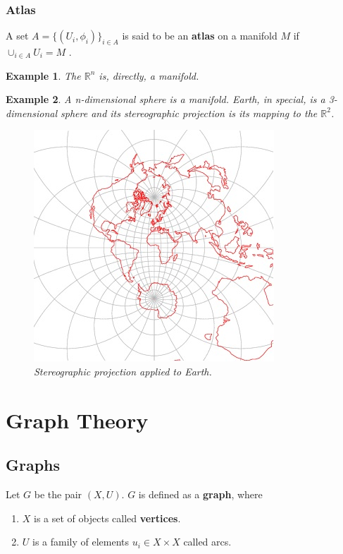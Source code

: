 \documentclass[12pt]{report}
\newtheorem{example}{Example}[section]
\begin{document}
\subsubsection{Atlas}

A set $A = \{(U_i, \phi_i)\}_{i \in A}$ is said to be an \textbf{atlas} on a manifold $M$ if $\cup_{i \in A} U_i = M$ \cite{lee2012}.

\begin{example}
	The $\mathbb{R}^n$ is, directly, a manifold.
\end{example}

\begin{example}
	A n-dimensional sphere is a manifold. Earth, in special, is a 3-dimensional sphere and its stereographic projection is its mapping to the $\mathbb{R}^2$. \cite{stereo_proj}

	\begin{figure}[H]
		\centering
		\captionsetup{justification=centering}

		\includegraphics[scale=.8]{stereo_earth}
		\caption{Stereographic projection applied to Earth.}
		\label{fig:stereographic_earth}
	\end{figure}
\end{example}

\section{Graph Theory}
\subsection{Graphs}

Let $G$ be the pair $(X, U)$. $G$ is defined as a \textbf{graph}, \cite{berge1973} where
\begin{enumerate}
	\item $X$ is a set of objects called \textbf{vertices}.
	\item $U$ is a family of elements $u_i \in X\times X$ called arcs.
\end{enumerate}
\end{document}
